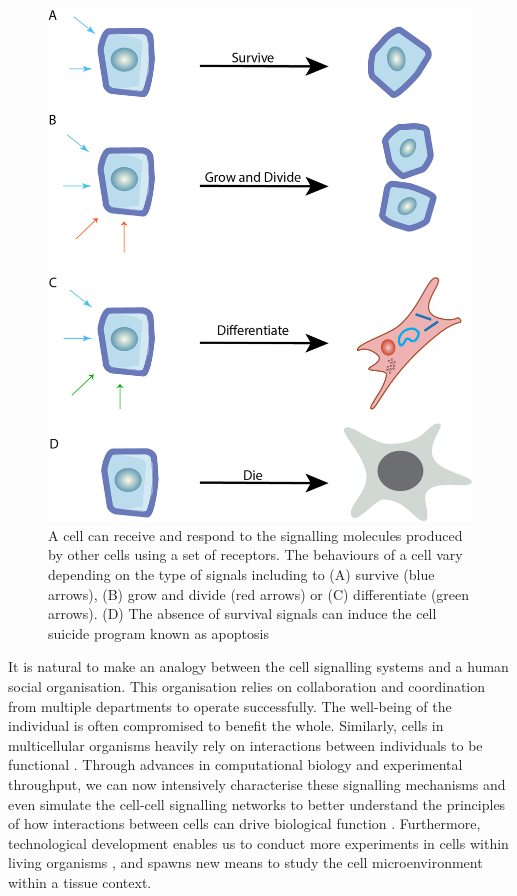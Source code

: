 \begin{figure}[htp]
    \centering
    \includegraphics[width=0.6\columnwidth]{Chapter1/Figures/Chap1_figure1.png}
    \caption[Cell relies on multiple extracellular signalling molecules to survive.]{A cell can receive and respond to the signalling molecules produced by other cells using a set of receptors. The behaviours of a cell vary depending on the type of signals including to (A) survive (blue arrows), (B) grow and divide (red arrows) or (C) differentiate (green arrows). (D) The absence of survival signals can induce the cell suicide program known as apoptosis}
    \label{fig:Chap1_figure1}
\end{figure}

It is natural to make an analogy between the cell signalling systems and a human social organisation. This organisation relies on collaboration and coordination from multiple departments to operate successfully. The well-being of the individual is often compromised to benefit the whole. Similarly, cells in multicellular organisms heavily rely on interactions between individuals to be functional \cite{bartee2018principles}. Through advances in computational biology and experimental throughput, we can now intensively characterise these signalling mechanisms and even simulate the cell-cell signalling networks to better understand the principles of how interactions between cells can drive biological function \cite{sprinzak2010cis, teague2016synthetic, toda2019engineering}. Furthermore, technological development enables us to conduct more experiments in cells within living organisms \cite{helmchen2005deep, periasamy2013methods}, and spawns new means to study the cell microenvironment within a tissue context. 

